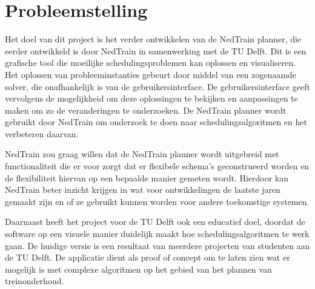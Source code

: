 \section{Probleemstelling}
\label{sec:probleemstelling}

Het doel van dit project is het verder ontwikkelen van de NedTrain planner, die eerder ontwikkeld is door NedTrain in samenwerking met de TU Delft. Dit is een grafische tool die moeilijke schedulingsproblemen kan oplossen en visualiseren. Het oplossen van probleeminstanties gebeurt door middel van een zogenaamde solver, die onafhankelijk is van de gebruikersinterface. De gebruikersinterface geeft vervolgens de mogelijkheid om deze oplossingen te bekijken en aanpassingen te maken om zo de veranderingen te onderzoeken. De NedTrain planner wordt gebruikt door NedTrain om onderzoek te doen naar schedulingsalgoritmen en het verbeteren daarvan.

NedTrain zou graag willen dat de NedTrain planner wordt uitgebreid met functionaliteit die er voor zorgt dat er flexibele schema's geconstrueerd worden en de flexibiliteit hiervan op een bepaalde manier gemeten wordt. Hierdoor kan NedTrain beter inzicht krijgen in wat voor ontwikkelingen de laatste jaren gemaakt zijn en of ze gebruikt kunnen worden voor andere toekomstige systemen. 

Daarnaast heeft het project voor de TU Delft ook een educatief doel, doordat de software op een visuele manier duidelijk maakt hoe schedulingsalgoritmen te werk gaan. De huidige versie is een resultaat van meerdere projecten van studenten aan de TU Delft. De applicatie dient als proof of concept om te laten zien wat er mogelijk is met complexe algoritmen op het gebied van het plannen van treinonderhoud.